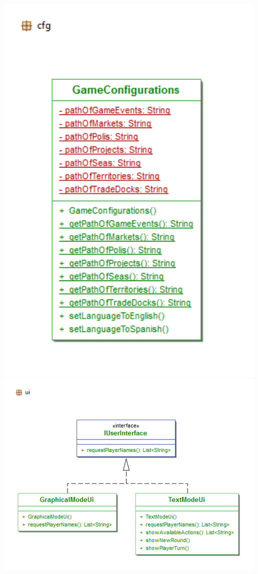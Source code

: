 \documentclass[11 pt]{book}
\begin{document}
\begin{center}
        \includegraphics[width=500px]{design-uml/package-cfg.png}
        \includegraphics[width=500px]{design-uml/package-ui.png}

\end{center}
\end{document}
